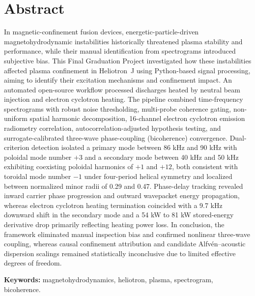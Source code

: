 \documentclass[12pt]{article}
\begin{document}
\section*{Abstract}
In magnetic-confinement fusion devices, energetic-particle-driven magnetohydrodynamic instabilities historically threatened plasma stability and performance, while their manual identification from spectrograms introduced subjective bias. This Final Graduation Project investigated how these instabilities affected plasma confinement in Heliotron~J using Python-based signal processing, aiming to identify their excitation mechanisms and confinement impact. An automated open-source workflow processed discharges heated by neutral beam injection and electron cyclotron heating. The pipeline combined time-frequency spectrograms with robust noise thresholding, multi-probe coherence gating, non-uniform spatial harmonic decomposition, 16-channel electron cyclotron emission radiometry correlation, autocorrelation-adjusted hypothesis testing, and surrogate-calibrated three-wave phase-coupling (bicoherence) convergence. Dual-criterion detection isolated a primary mode between 86 kHz and 90 kHz with poloidal mode number $+3$ and a secondary mode between 40 kHz and 50 kHz exhibiting coexisting poloidal harmonics of $+1$ and $+12$, both consistent with toroidal mode number $-1$ under four-period helical symmetry and localized between normalized minor radii of 0.29 and 0.47. Phase-delay tracking revealed inward carrier phase progression and outward wavepacket energy propagation, whereas electron cyclotron heating termination coincided with a 9.7 kHz downward shift in the secondary mode and a 54 kW to 81 kW stored-energy derivative drop primarily reflecting heating power loss. In conclusion, the framework eliminated manual inspection bias and confirmed nonlinear three-wave coupling, whereas causal confinement attribution and candidate Alfv\'en--acoustic dispersion scalings remained statistically inconclusive due to limited effective degrees of freedom.

\noindent\textbf{Keywords:} magnetohydrodynamics, heliotron, plasma, spectrogram, bicoherence.

\clearpage






\clearpage

\clearpage
{}
{}
{\setlength{\parskip}{2pt}%

}







\end{document}
